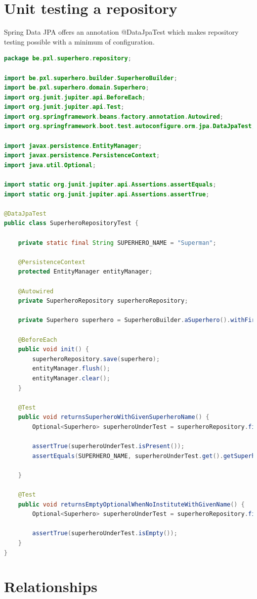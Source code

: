 \section{Unit testing a repository}

Spring Data JPA offers an annotation @DataJpaTest which makes repository testing possible with a minimum of configuration. 


\begin{lstlisting}[frame=single, language=java]
package be.pxl.superhero.repository;

import be.pxl.superhero.builder.SuperheroBuilder;
import be.pxl.superhero.domain.Superhero;
import org.junit.jupiter.api.BeforeEach;
import org.junit.jupiter.api.Test;
import org.springframework.beans.factory.annotation.Autowired;
import org.springframework.boot.test.autoconfigure.orm.jpa.DataJpaTest;

import javax.persistence.EntityManager;
import javax.persistence.PersistenceContext;
import java.util.Optional;

import static org.junit.jupiter.api.Assertions.assertEquals;
import static org.junit.jupiter.api.Assertions.assertTrue;

@DataJpaTest
public class SuperheroRepositoryTest {

	private static final String SUPERHERO_NAME = "Superman";

	@PersistenceContext
	protected EntityManager entityManager;

	@Autowired
	private SuperheroRepository superheroRepository;

	private Superhero superhero = SuperheroBuilder.aSuperhero().withFirstName("Clark").withLastName("Kent").withSuperheroName(SUPERHERO_NAME).build();

	@BeforeEach
	public void init() {
		superheroRepository.save(superhero);
		entityManager.flush();
		entityManager.clear();
	}

	@Test
	public void returnsSuperheroWithGivenSuperheroName() {
		Optional<Superhero> superheroUnderTest = superheroRepository.findSuperheroBySuperheroName(SUPERHERO_NAME);

		assertTrue(superheroUnderTest.isPresent());
		assertEquals(SUPERHERO_NAME, superheroUnderTest.get().getSuperheroName());

	}

	@Test
	public void returnsEmptyOptionalWhenNoInstituteWithGivenName() {
		Optional<Superhero> superheroUnderTest = superheroRepository.findSuperheroBySuperheroName("Robin Hood");

		assertTrue(superheroUnderTest.isEmpty());
	}
}

\end{lstlisting}


\section{Relationships}




